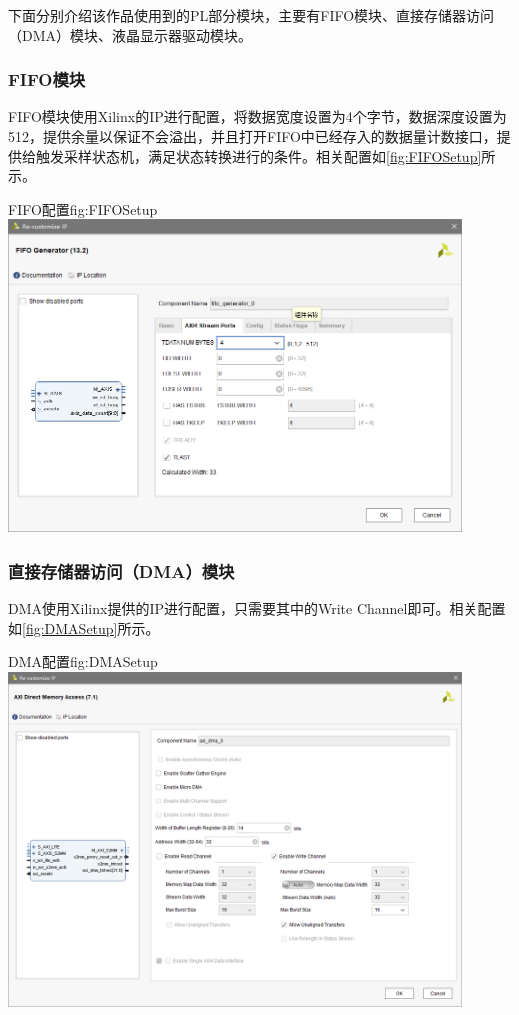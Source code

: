 \documentclass[supercite]{HustGraduPaper}
\begin{document}
	下面分别介绍该作品使用到的PL部分模块，主要有FIFO模块、直接存储器访问（DMA）模块、液晶显示器驱动模块。
	
	\subsubsection{FIFO模块}
	FIFO模块使用Xilinx的IP进行配置，将数据宽度设置为4个字节，数据深度设置为512，提供余量以保证不会溢出，并且打开FIFO中已经存入的数据量计数接口，提供给触发采样状态机，满足状态转换进行的条件。相关配置如\autoref{fig:FIFOSetup}所示。
	
	\begin{generalfig}[htb]{FIFO配置}{fig:FIFOSetup}
		\includegraphics[width=12cm]{Figures/FIFOSetup.png}
	\end{generalfig}

	\subsubsection{直接存储器访问（DMA）模块}
	DMA使用Xilinx提供的IP进行配置，只需要其中的Write Channel即可。相关配置如\autoref{fig:DMASetup}所示。
	
	\begin{generalfig}[htb]{DMA配置}{fig:DMASetup}
		\includegraphics[width=12cm]{Figures/DMASetup.png}
	\end{generalfig}
	
\end{document}
